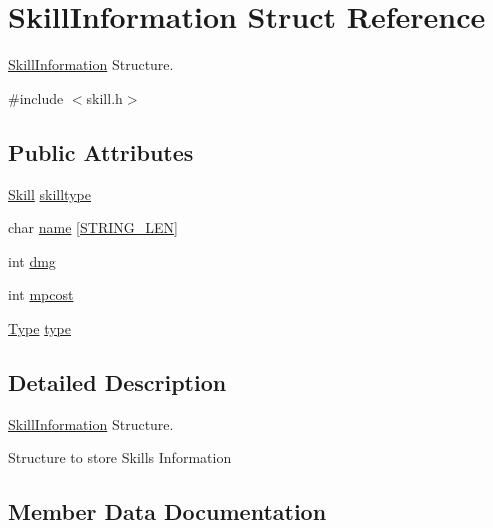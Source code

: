 \hypertarget{structSkillInformation}{}\section{Skill\+Information Struct Reference}
\label{structSkillInformation}


\hyperlink{structSkillInformation}{Skill\+Information} Structure.  




{\ttfamily \#include $<$skill.\+h$>$}

\subsection*{Public Attributes}
\begin{DoxyCompactItemize}
\item 
\hyperlink{skill_8h_a53d804c2b0df9ad8b7f77f8c1ee82392}{Skill} \hyperlink{structSkillInformation_ae5b5ea839058608f659c16fb6895c472}{skilltype}
\item 
char \hyperlink{structSkillInformation_a0bc25f02bc205637e32c7a29c2f2cbf6}{name} \mbox{[}\hyperlink{user_8h_ad6d94ce273637446121c9cbd16b6077f}{S\+T\+R\+I\+N\+G\+\_\+\+L\+EN}\mbox{]}
\item 
int \hyperlink{structSkillInformation_ac18e80433dc53ca86b0896d334cfcc81}{dmg}
\item 
int \hyperlink{structSkillInformation_a2e2586c2d8ef65c15b50380a04e1f473}{mpcost}
\item 
\hyperlink{skill_8h_a1d1cfd8ffb84e947f82999c682b666a7}{Type} \hyperlink{structSkillInformation_af59700d7ac0a0bf817972b829f488d95}{type}
\end{DoxyCompactItemize}


\subsection{Detailed Description}
\hyperlink{structSkillInformation}{Skill\+Information} Structure. 

Structure to store Skill\textquotesingle{}s Information 

\subsection{Member Data Documentation}
\mbox{\label{structSkillInformation_ac18e80433dc53ca86b0896d334cfcc81}} 
